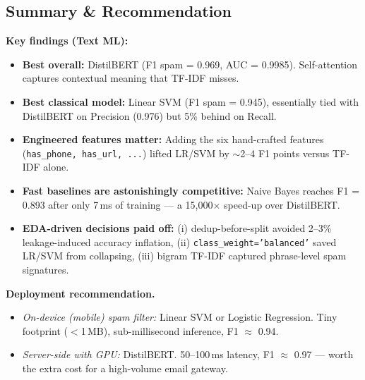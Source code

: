 \subsection{Summary \& Recommendation}

\begin{importantbox}
\textbf{Key findings (Text ML):}
\begin{itemize}
    \item \textbf{Best overall:} DistilBERT (F1 spam = 0.969, AUC = 0.9985). Self-attention captures contextual meaning that TF-IDF misses.
    \item \textbf{Best classical model:} Linear SVM (F1 spam = 0.945), essentially tied with DistilBERT on Precision (0.976) but 5\% behind on Recall.
    \item \textbf{Engineered features matter:} Adding the six hand-crafted features (\texttt{has\_phone, has\_url,~...}) lifted LR/SVM by $\sim$2--4 F1 points versus TF-IDF alone.
    \item \textbf{Fast baselines are astonishingly competitive:} Naive Bayes reaches F1 = 0.893 after only 7\,ms of training --- a 15{,}000$\times$ speed-up over DistilBERT.
    \item \textbf{EDA-driven decisions paid off:} (i) dedup-before-split avoided 2--3\% leakage-induced accuracy inflation, (ii) \texttt{class\_weight='balanced'} saved LR/SVM from collapsing, (iii) bigram TF-IDF captured phrase-level spam signatures.
\end{itemize}

\textbf{Deployment recommendation.}
\begin{itemize}
    \item \emph{On-device (mobile) spam filter:} Linear SVM or Logistic Regression. Tiny footprint ($<$1\,MB), sub-millisecond inference, F1 $\approx$ 0.94.
    \item \emph{Server-side with GPU:} DistilBERT. 50--100\,ms latency, F1 $\approx$ 0.97 --- worth the extra cost for a high-volume email gateway.
\end{itemize}
\end{importantbox}
